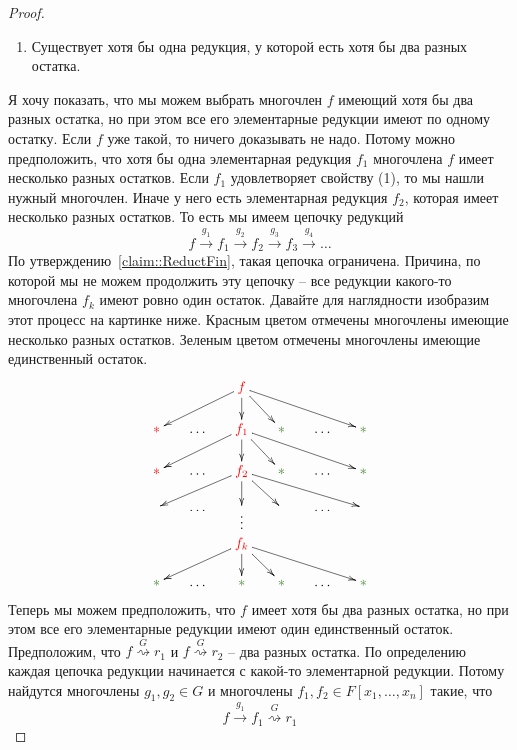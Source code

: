 \begin{proof}
\begin{enumerate}
\item Существует хотя бы одна редукция, у которой есть хотя бы два разных остатка.
\end{enumerate}
Я хочу показать, что мы можем выбрать многочлен $f$ имеющий хотя бы два разных остатка, но при этом все его элементарные редукции имеют по одному остатку.
Если $f$ уже такой, то ничего доказывать не надо.
Потому можно предположить, что хотя бы одна элементарная редукция $f_1$ многочлена $f$ имеет несколько разных остатков.
Если $f_1$ удовлетворяет свойству (1), то мы нашли нужный многочлен.
Иначе у него есть элементарная редукция $f_2$, которая имеет несколько разных остатков.
То есть мы имеем цепочку редукций
\[
f\stackrel{g_1}{\longrightarrow}f_1\stackrel{g_2}{\longrightarrow}f_2\stackrel{g_3}{\longrightarrow}f_3\stackrel{g_4}{\longrightarrow}\ldots
\]
По утверждению~\ref{claim::ReductFin}, такая цепочка ограничена.
Причина, по которой мы не можем продолжить эту цепочку -- все редукции какого-то многочлена $f_k$ имеют ровно один остаток.
Давайте для наглядности изобразим этот процесс на картинке ниже.
Красным цветом отмечены многочлены имеющие несколько разных остатков.
Зеленым цветом отмечены многочлены имеющие единственный остаток.
\[
\xymatrix@R=15pt@C=15pt{
	{}&{}&{\textcolor{red}{f}}\ar[dll]\ar[d]\ar[dr]\ar[drrr]&{}&{}&{}\\
	{\textcolor{red}{*}}&{\ldots}&{\textcolor{red}{f_1}}\ar[dll]\ar[d]\ar[dr]\ar[drrr]&{\textcolor{OliveGreen}{*}}&{\ldots}&{\textcolor{OliveGreen}{*}}\\
	{\textcolor{red}{*}}&{\ldots}&{\textcolor{red}{f_2}}\ar[dll]\ar[d]\ar[dr]\ar[drrr]&{\textcolor{OliveGreen}{*}}&{\ldots}&{\textcolor{OliveGreen}{*}}\\
	{}&{\ldots}&{}\ar@{}[d]|(.3){\vdots}&{}&{\ldots}&{}\\
	{}&{}&{\textcolor{red}{f_k}}\ar[dll]\ar[d]\ar[dr]\ar[drrr]&{}&{}&{}\\
	{\textcolor{OliveGreen}{*}}&{\ldots}&{\textcolor{OliveGreen}{*}}&{\textcolor{OliveGreen}{*}}&{\ldots}&{\textcolor{OliveGreen}{*}}\\
}
\]
Теперь мы можем предположить, что $f$ имеет хотя бы два разных остатка, но при этом все его элементарные редукции имеют один единственный остаток.
Предположим, что $f  \stackrel{G}{\rightsquigarrow}  r_1$ и $f  \stackrel{G}{\rightsquigarrow}  r_2$ -- два разных остатка.
По определению каждая цепочка редукции начинается с какой-то элементарной редукции.
Потому найдутся многочлены $g_1, g_2\in G$ и многочлены $f_1, f_2\in F[x_1,\ldots,x_n]$ такие, что 
\[
f  \stackrel{g_1}{\longrightarrow}f_1  \stackrel{G}{\rightsquigarrow} r_1
\]
\end{proof}
